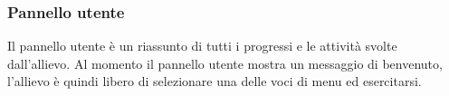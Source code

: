         \subsubsection{Pannello utente}
          Il pannello utente è un riassunto di tutti i progressi e le attività svolte dall'allievo. Al momento il pannello utente mostra un messaggio di benvenuto, l'allievo è quindi libero di selezionare una delle voci di menu ed esercitarsi.
        
        
               
	\newpage
